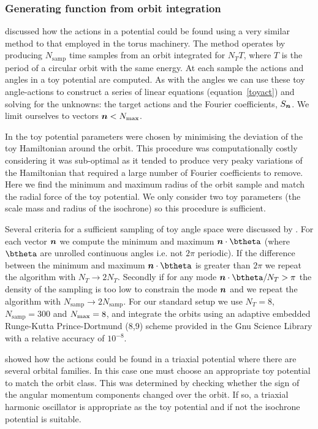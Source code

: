 \documentclass[useAMS,usenatbib,fleqn,a4paper]{mn2e}
\newcommand{\bs}[1]{\bmath{#1}}
\begin{document}
\subsubsection{Generating function from orbit integration}\label{Method::Genfunc}
\cite{SandersBinney2014} discussed how the actions in a potential could be found using a very similar method to that employed in the torus machinery. The method operates by producing $N_\mathrm{samp}$ time samples from an orbit integrated for $N_T T$, where $T$ is the period of a circular orbit with the same energy. At each sample the actions and angles in a toy potential are computed. As with the angles we can use these toy angle-actions to construct a series of linear equations (equation~\ref{toyact}) and solving for the unknowns: the target actions and the Fourier coefficients, $S_{\bs{n}}$. We limit ourselves to vectors $\bs{n}<N_\mathrm{max}$.

In \cite{SandersBinney2014} the toy potential parameters were chosen by minimising the deviation of the toy Hamiltonian around the orbit. This procedure was computationally costly considering it was sub-optimal as it tended to produce very peaky variations of the Hamiltonian that required a large number of Fourier coefficients to remove. Here we find the minimum and maximum radius of the orbit sample and match the radial force of the toy potential. We only consider two toy parameters (the scale mass and radius of the isochrone) so this procedure is sufficient.

Several criteria for a sufficient sampling of toy angle space were discussed by \cite{SandersBinney2014}. For each vector $\bs{n}$ we compute the minimum and maximum $\bs{n}\cdot\btheta$ (where $\btheta$ are unrolled continuous angles i.e. not $2\pi$ periodic). If the difference between the minimum and maximum $\bs{n}\cdot\btheta$ is greater than $2\pi$ we repeat the algorithm with $N_T\rightarrow 2N_T$. Secondly if for any mode $\bs{n}\cdot\btheta/N_T>\pi$ the density of the sampling is too low to constrain the mode $\bs{n}$ and we repeat the algorithm with $N_\mathrm{samp}\rightarrow 2N_\mathrm{samp}$. For our standard setup we use $N_T=8$, $N_\mathrm{samp}=300$ and $N_{\rm max}=8$, and integrate the orbits using an adaptive embedded Runge-Kutta Prince-Dortmund (8,9) scheme provided in the Gnu Science Library \citep{GSL} with a relative accuracy of $10^{-8}$.

\cite{SandersBinney2014} showed how the actions could be found in a triaxial potential where there are several orbital families. In this case one must choose an appropriate toy potential to match the orbit class. This was determined by checking whether the sign of the angular momentum components changed over the orbit. If so, a triaxial harmonic oscillator is appropriate as the toy potential and if not the isochrone potential is suitable.
\end{document}
